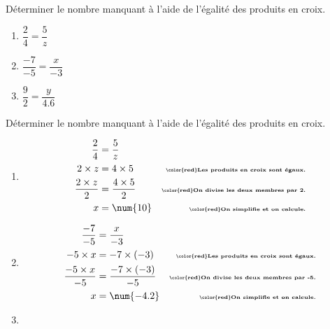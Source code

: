 \begin{exercice*}
    Déterminer le nombre manquant à l'aide de l'égalité des produits en croix.    
    \begin{enumerate}
        \item $\dfrac{2}{4}=\dfrac{5}{z}$\smallskip
        \item $\dfrac{-7}{-5}=\dfrac{x}{-3}$\smallskip
        \item $\dfrac{9}{2}=\dfrac{y}{\num{4.6}}$        
    \end{enumerate}
\end{exercice*}
\begin{corrige}
    Déterminer le nombre manquant à l'aide de l'égalité des produits en croix.\par
    \begin{enumerate}
        \item 
        \begin{align*}
            \dfrac{2}{4}        &=\dfrac{5}{z}           &\\
            2\times z           &= 4\times 5             &\text{\bfseries\tiny\color{red}Les produits en croix sont égaux.}\\
            \dfrac{2\times z}{2}&= \dfrac{4\times 5}{2}  &\text{\bfseries\tiny\color{red}On divise les deux membres par 2.}\\
            x                   &=\num{10}              &\text{\bfseries\tiny\color{red}On simplifie et on calcule.}
        \end{align*}
        \item 
        \begin{align*}
            \dfrac{-7}{-5}        &=\dfrac{x}{-3}           &\\
            -5\times x           &= -7\times (-3)           &\text{\bfseries\tiny\color{red}Les produits en croix sont égaux.}\\
            \dfrac{-5\times x}{-5}&= \dfrac{-7\times (-3)}{-5}  &\text{\bfseries\tiny\color{red}On divise les deux membres par -5.}\\
            x                   &=\num{-4.2}              &\text{\bfseries\tiny\color{red}On simplifie et on calcule.}
        \end{align*}
        \item 

\end{enumerate}
\end{corrige}
